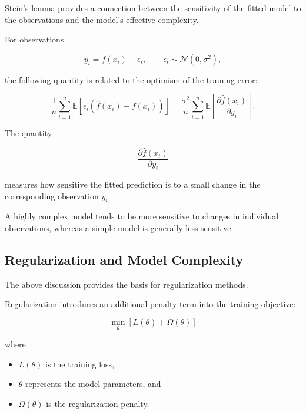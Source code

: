 \documentclass{article}
\begin{document}
Stein's lemma provides a connection between the sensitivity of the fitted model to the observations and the model's effective complexity.

For observations

\[
y_i=f(x_i)+\epsilon_i,
\qquad
\epsilon_i\sim\mathcal{N}(0,\sigma^2),
\]

the following quantity is related to the optimism of the training error:

\begin{equation}
	\frac{1}{n}
	\sum_{i=1}^{n}
	\mathbb{E}
	\left[
	\epsilon_i
	\left(
	\hat{f}(x_i)-f(x_i)
	\right)
	\right]
	=
	\frac{\sigma^2}{n}
	\sum_{i=1}^{n}
	\mathbb{E}
	\left[
	\frac{\partial \hat{f}(x_i)}
	{\partial y_i}
	\right].
\end{equation}

The quantity

\begin{equation}
	\boxed{
		\frac{\partial \hat{f}(x_i)}{\partial y_i}
	}
\end{equation}

measures how sensitive the fitted prediction is to a small change in the corresponding observation $y_i$.

A highly complex model tends to be more sensitive to changes in individual observations, whereas a simple model is generally less sensitive.

\subsection{Regularization and Model Complexity}

The above discussion provides the basis for regularization methods.

Regularization introduces an additional penalty term into the training objective:

\begin{equation}
	\boxed{
		\min_{\theta}
		\left[
		L(\theta)
		+
		\Omega(\theta)
		\right]
	}
\end{equation}

where

\begin{itemize}
	\item $L(\theta)$ is the training loss,
	\item $\theta$ represents the model parameters, and
	\item $\Omega(\theta)$ is the regularization penalty.
\end{itemize}
\end{document}
